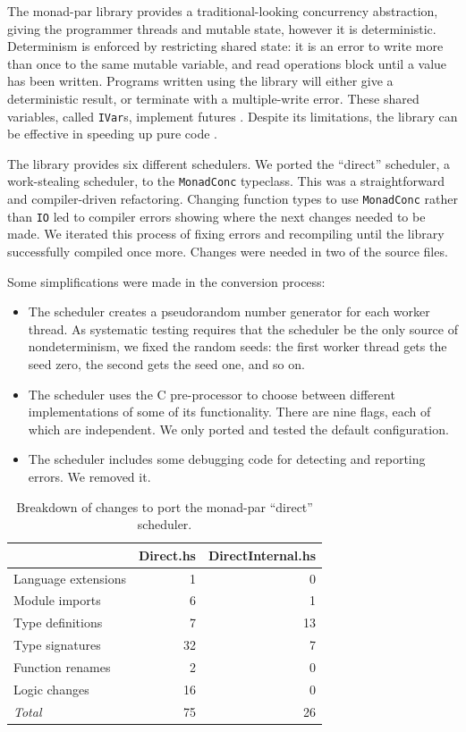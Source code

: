 The monad-par library \parencite{monad_par,marlow2011} provides a
traditional-looking concurrency abstraction, giving the programmer
threads and mutable state, however it is deterministic.  Determinism
is enforced by restricting shared state: it is an error to write more
than once to the same mutable variable, and read operations block
until a value has been written.  Programs written using the library
will either give a deterministic result, or terminate with a
multiple-write error.  These shared variables, called \verb|IVar|s,
implement futures \parencite{marlow2011}.  Despite its limitations, the
library can be effective in speeding up pure code \parencite{marlow2011}.

The library provides six different schedulers.  We ported the
``direct'' scheduler, a work-stealing scheduler, to the
\verb|MonadConc| typeclass.  This was a straightforward and
compiler-driven refactoring.  Changing function types to use
\verb|MonadConc| rather than \verb|IO| led to compiler errors showing
where the next changes needed to be made.  We iterated this process of
fixing errors and recompiling until the library successfully compiled
once more.  Changes were needed in two of the source files.

Some simplifications were made in the conversion process:

\begin{itemize}
\item The scheduler creates a pseudorandom number generator for each
  worker thread.  As systematic testing requires that the scheduler be
  the only source of nondeterminism, we fixed the random seeds: the
  first worker thread gets the seed zero, the second gets the seed
  one, and so on.
\item The scheduler uses the C pre-processor to choose between
  different implementations of some of its functionality.  There are
  nine flags, each of which are independent.  We only ported and
  tested the default configuration.
\item The scheduler includes some debugging code for detecting and
  reporting errors.  We removed it.
\end{itemize}

\begin{table}
  \centering
  \begin{tabular}{lrr} \toprule
    & Direct.hs & DirectInternal.hs \\ \midrule
    Language extensions & 1 & 0 \\
    Module imports & 6 & 1 \\
    Type definitions & 7 & 13 \\
    Type signatures & 32 & 7 \\
    Function renames & 2 & 0 \\
    Logic changes & 16 & 0 \\ \midrule
    \emph{Total} & 75 & 26 \\ \bottomrule
  \end{tabular}
  \caption{Breakdown of changes to port the monad-par ``direct'' scheduler.}\label{tbl:parmonad_diff}
\end{table}

